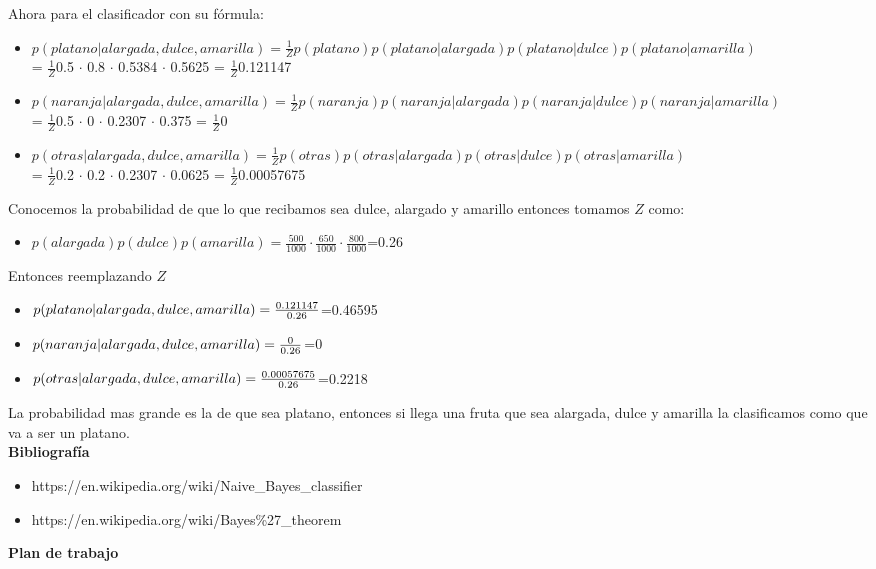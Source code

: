 \documentclass{article}
\begin{document}
  Ahora para el clasificador con su fórmula:
  \begin{itemize}
   \item $p(platano|alargada,dulce,amarilla)=\frac{1}{Z}p(platano)p(platano|alargada)p(platano|dulce)p(platano|amarilla)$ \\=
   $\frac{1}{Z}$0.5 $\cdot$ 0.8 $\cdot$ 0.5384 $\cdot$ 0.5625 = $\frac{1}{Z}$0.121147
   \item $p(naranja|alargada,dulce,amarilla)=\frac{1}{Z}p(naranja)p(naranja|alargada)p(naranja|dulce)p(naranja|amarilla)$ \\=
   $\frac{1}{Z}$0.5 $\cdot$ 0 $\cdot$ 0.2307 $\cdot$ 0.375 = $\frac{1}{Z}$0
   \item $p(otras|alargada,dulce,amarilla)=\frac{1}{Z}p(otras)p(otras|alargada)p(otras|dulce)p(otras|amarilla)$ \\=
   $\frac{1}{Z}$0.2 $\cdot$ 0.2 $\cdot$ 0.2307 $\cdot$ 0.0625 = $\frac{1}{Z}$0.00057675
  \end{itemize}
  Conocemos la probabilidad de que lo que recibamos sea dulce, alargado y amarillo entonces tomamos $Z$ como:
  \begin{itemize}
   \item $p(alargada)p(dulce)p(amarilla) = \frac{500}{1000}\cdot\frac{650}{1000}\cdot\frac{800}{1000}$=0.26
  \end{itemize}
  Entonces reemplazando $Z$
  \begin{itemize}
   \item $p(platano|alargada,dulce,amarilla) = \frac{0\ldotp121147}{0\ldotp26}$=0.46595
   \item $p(naranja|alargada,dulce,amarilla) = \frac{0}{0\ldotp26}$=0
   \item $p(otras|alargada,dulce,amarilla) = \frac{0\ldotp00057675}{0\ldotp26}$=0.2218
  \end{itemize}
  La probabilidad mas grande es la de que sea platano, entonces si llega una fruta que sea alargada, dulce y amarilla la clasificamos como que va a ser un 
  platano.\\
  
{\bf Bibliografía}
\begin{itemize}
 \item https://en.wikipedia.org/wiki/Naive\_Bayes\_classifier
 \item https://en.wikipedia.org/wiki/Bayes\%27\_theorem
\end{itemize}

{\bf Plan de trabajo}\\
\end{document}
